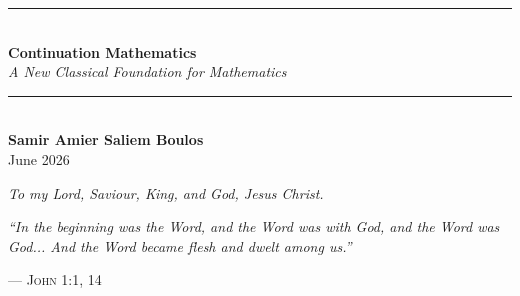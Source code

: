 \documentclass[13pt,openany]{book}
\theoremstyle{plain}
\theoremstyle{definition}
\begin{document}
\begin{titlepage}
    \centering
    \vspace*{\fill} 

    \noindent\rule{\textwidth}{1pt} \\[1.5em]

    {\Huge \textbf{Continuation Mathematics}} \\[1.5em]

    {\Large \textit{A New Classical Foundation for Mathematics}} \\[1.2em]

    \noindent\rule{\textwidth}{1pt} \\[3cm]

    {\Large \textbf{Samir Amier Saliem Boulos}} \\
    \vspace{1cm}
    {\large June 2026}

    \vspace*{\fill} 
\end{titlepage}


\frontmatter

\cleardoublepage
\thispagestyle{empty}
\vspace*{0.3\textheight}
\begin{center}
    {\Large\itshape To my Lord, Saviour, King, and God, Jesus Christ.}
\end{center}
\clearpage

\cleardoublepage
\thispagestyle{empty}
\vspace*{0.3\textheight}
\begin{flushright}
    \begin{minipage}{0.7\textwidth}
        \raggedleft
        \Large\itshape
        ``In the beginning was the Word, and the Word was with God, and the Word was God... And the Word became flesh and dwelt among us.''
        
        \vspace{0.5em}
        \normalsize\normalfont\textsc{— John 1:1, 14}
    \end{minipage}
\end{flushright}
\clearpage

\tableofcontents

\end{document}
